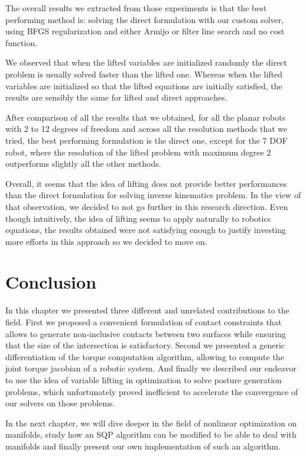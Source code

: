 The overall results we extracted from those experiments is that the best performing method is: solving the direct formulation with our custom solver, using BFGS regularization and either Armijo or filter line search and no cost function.

We observed that when the lifted variables are initialized randomly the direct problem is usually solved faster than the lifted one.
Whereas when the lifted variables are initialized so that the lifted equations are initially satisfied, the results are sensibly the same for lifted and direct approaches.

After comparison of all the results that we obtained, for all the planar robots with 2 to 12 degrees of freedom and across all the resolution methods that we tried, the best performing formulation is the direct one, except for the 7 DOF robot, where the resolution of the lifted problem with maximum degree 2 outperforms slightly all the other methods.

Overall, it seems that the idea of lifting does not provide better performances than the direct formulation for solving inverse kinematics problem.
In the view of that observation, we decided to not go further in this research direction.
Even though intuitively, the idea of lifting seems to apply naturally to robotics equations, the results obtained were not satisfying enough to justify investing more efforts in this approach so we decided to move on.

\section{Conclusion}
\label{sec:chap3_conclusion}

In this chapter we presented three different and unrelated contributions to the field.
First we proposed a convenient formulation of contact constraints that allows to generate non-inclusive contacts between two surfaces while ensuring that the size of the intersection is satisfactory.
Second we presented a generic differentiation of the torque computation algorithm, allowing to compute the joint torque jacobian of a robotic system.
And finally we described our endeavor to use the idea of variable lifting in optimization to solve posture generation problems, which unfortunately proved inefficient to accelerate the convergence of our solvers on those problems.

In the next chapter, we will dive deeper in the field of nonlinear optimization on manifolds, study how an SQP algorithm can be modified to be able to deal with manifolds and finally present our own implementation of such an algorithm.
